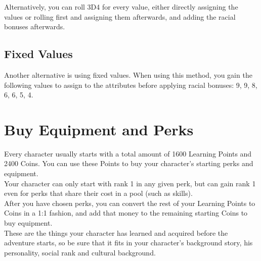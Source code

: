 Alternatively, you can roll 3D4 for every value, either directly assigning the values or rolling first and assigning them afterwards, and adding the racial bonuses afterwards. 


\subsection{Fixed Values}\label{subsec:pointFixed}

Another alternative is using fixed values.
When using this method, you gain the following values to assign to the attributes before applying racial bonuses: 9, 9, 8, 6, 6, 5, 4.


\section{Buy Equipment and Perks}\label{sec:charCreationPerkAndEquip}

Every character usually starts with a total amount of 1600 Learning Points and 2400 Coins.
You can use these Points to buy your character's starting perks and equipment.\\
Your character can only start with rank 1 in any given perk, but can gain rank 1 even for perks that share their cost in a pool (such as skills).\\
After you have chosen perks, you can convert the rest of your Learning Points to Coins in a 1:1 fashion, and add that money to the remaining starting Coins to buy equipment.\\
These are the things your character has learned and acquired before the adventure starts, so be sure that it fits in your character's background story, his personality, social rank and cultural background.\\

